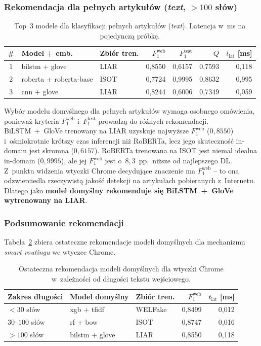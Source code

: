 \documentclass[oneside,polski,logo]{amuthesis}
\begin{document}
\subsubsection*{Rekomendacja dla pełnych artykułów (\textit{text},
$>100$ słów)}

\begin{table}[ht]
\centering
\caption{Top~3 modele dla klasyfikacji pełnych artykułów
(\textit{text}). Latencja w~ms na pojedynczą próbkę.}
\label{tab:rek_text}
\begin{tabular}{cllrrrr}
\toprule
\# & Model + emb. & Zbiór tren. & $F_1^{\text{web}}$ & $F_1^{\text{test}}$ & $Q$ & $t_{\text{lat}}$ [ms] \\
\midrule
1 & bilstm + glove          & LIAR & 0,8550 & 0,6157 & 0,7593 & 0,118 \\
2 & roberta + roberta-base  & ISOT & 0,7724 & 0,9995 & 0,8632 & 0,995 \\
3 & cnn + glove             & LIAR & 0,8244 & 0,6006 & 0,7349 & 0,059 \\
\bottomrule
\end{tabular}
\end{table}

Wybór modelu domyślnego dla pełnych artykułów wymaga osobnego
omówienia, ponieważ kryteria $F_1^{\text{web}}$ i~$F_1^{\text{test}}$
prowadzą do różnych rekomendacji. BiLSTM~+~GloVe trenowany na LIAR
uzyskuje najwyższe $F_1^{\text{web}}$ (\(0{,}8550\)) i~ośmiokrotnie
krótszy czas inferencji niż RoBERTa, lecz jego skuteczność in-domain
jest skromna (\(0{,}6157\)). RoBERTa trenowana na ISOT jest niemal
idealna in-domain (\(0{,}9995\)), ale jej $F_1^{\text{web}}$ jest
o~\(8{,}3\)~pp.\ niższe od najlepszego DL. Z~punktu widzenia wtyczki
Chrome decydujące znaczenie ma $F_1^{\text{web}}$ -- to ona
odzwierciedla rzeczywistą jakość detekcji na artykułach pobieranych
z~Internetu. Dlatego jako \textbf{model domyślny rekomenduje się
BiLSTM~+~GloVe wytrenowany na LIAR}.

\subsubsection*{Podsumowanie rekomendacji}

Tabela~\ref{tab:rek_final} zbiera ostateczne rekomendacje modeli
domyślnych dla mechanizmu \textit{smart routingu} we wtyczce Chrome.

\begin{table}[ht]
\centering
\caption{Ostateczna rekomendacja modeli domyślnych dla wtyczki
Chrome w~zależności od długości tekstu wejściowego.}
\label{tab:rek_final}
\begin{tabular}{lllrr}
\toprule
Zakres długości & Model domyślny & Zbiór tren. & $F_1^{\text{web}}$ & $t_{\text{lat}}$ [ms] \\
\midrule
$<30$ słów        & xgb + tfidf            & WELFake & 0,8499 & 0,012 \\
$30$--$100$ słów  & rf + bow               & ISOT    & 0,8747 & 0,016 \\
$>100$ słów       & bilstm + glove         & LIAR    & 0,8550 & 0,118 \\
\bottomrule
\end{tabular}
\end{table}
\end{document}
